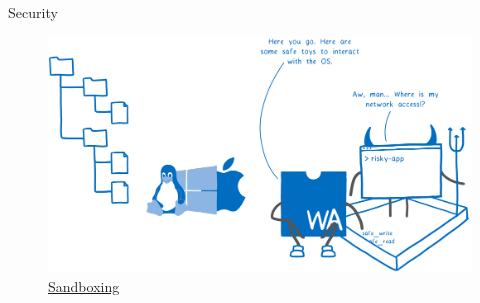 \documentclass{beamer}
\begin{document}
\begin{frame}{Security}
    \begin{figure}
        \includegraphics[scale=0.07]{./images/sandbox.png}
        \caption{\href{https://hacks.mozilla.org/2019/03/standardizing-wasi-a-webassembly-system-interface/}{Sandboxing}}
    \end{figure}
\end{frame}
\end{document}
